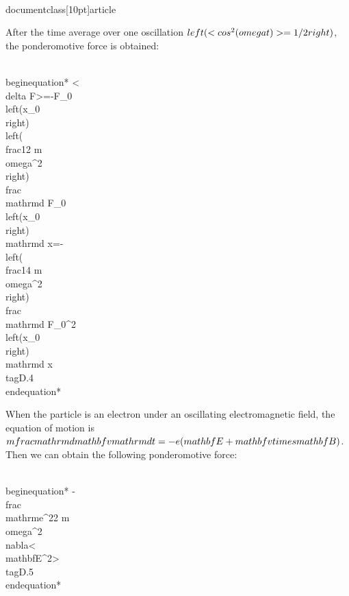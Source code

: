 \\documentclass[10pt]{article}
\begin{document}
{{{{{{After the time average over one oscillation $\\left(<\\cos ^{2}(\\omega t)>=1 / 2\\right)$, the ponderomotive force is obtained:


\\begin{equation*}
<\\delta F>=-F_{0}\\left(x_{0}\\right)\\left(\\frac{1}{2 m \\omega^{2}}\\right) \\frac{\\mathrm{d} F_{0}\\left(x_{0}\\right)}{\\mathrm{d} x}=-\\left(\\frac{1}{4 m \\omega^{2}}\\right) \\frac{\\mathrm{d} F_{0}^{2}\\left(x_{0}\\right)}{\\mathrm{d} x} \\tag{D.4}
\\end{equation*}


When the particle is an electron under an oscillating electromagnetic field, the equation of motion is $m \\frac{\\mathrm{d} \\mathbf{v}}{\\mathrm{d} t}=-e(\\mathbf{E}+\\mathbf{v} \\times \\mathbf{B})$. Then we can obtain the following ponderomotive force:


\\begin{equation*}
-\\frac{\\mathrm{e}^{2}}{2 m \\omega^{2}} \\nabla<\\mathbf{E}^{2}> \\tag{D.5}
\\end{equation*}


}}}}}}
\end{document}
